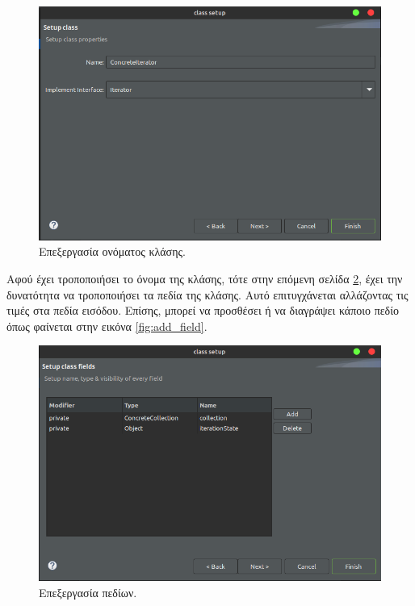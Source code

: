\begin{figure}[H]
    \centering
    \includegraphics[width=1.0\textwidth]{Figures/class_name.png}
    \caption{Επεξεργασία ονόματος κλάσης.}
    \label{fig:class_name}
\end{figure}
Αφού έχει τροποποιήσει το όνομα της κλάσης, τότε στην επόμενη σελίδα \ref{fig:edit_fields}, 
έχει την δυνατότητα να τροποποιήσει τα πεδία της κλάσης. Αυτό επιτυγχάνεται αλλάζοντας τις τιμές στα πεδία εισόδου. 
Επίσης, μπορεί να προσθέσει ή να διαγράψει κάποιο πεδίο όπως φαίνεται στην εικόνα \ref{fig:add_field}.
\begin{figure}[H]
    \centering
    \includegraphics[width=1.0\textwidth]{Figures/edit_fields.png}
    \caption{Επεξεργασία πεδίων.}
    \label{fig:edit_fields}
\end{figure}
